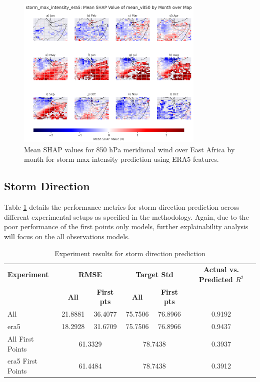 \begin{figure}[ht]
    \centering
    \includegraphics[width=0.8\textwidth]{../figures/generated/experiments/storm_max_intensity/geographic_corr/storm_max_intensity_era5_shap_mean_v850_map_by_month.png}
    \caption{Mean SHAP values for 850 hPa meridional wind over East Africa by month for storm max intensity prediction using ERA5 features.}
    \label{fig:storm_max_intensity_era5_shap_mean_v850_map_by_month}
\end{figure}

\clearpage
\subsection{Storm Direction}

Table \ref{tab:storm_direction_results} details the performance metrics for storm direction prediction across different experimental setups as specified in the methodology. Again, due to the poor performance of the first points only models, further explainability analysis will focus on the all observations models.

\begin{table}[ht]
\centering
\caption{Experiment results for storm direction prediction}
\label{tab:storm_direction_results}
\begin{tabular}{lccccc}
\hline
\textbf{Experiment} & \multicolumn{2}{c}{\textbf{RMSE}} & \multicolumn{2}{c}{\textbf{Target Std}} & \textbf{Actual vs. Predicted $R^2$} \\
\cline{2-5}
 & \textbf{All} & \textbf{First pts} & \textbf{All} & \textbf{First pts} &  \\
\hline
All              & 21.8881 & 36.4077 & 75.7506 & 76.8966 & 0.9192 \\
\acrshort{era5}             & 18.2928 & 31.6709 & 75.7506 & 76.8966 & 0.9437 \\
All First Points & \multicolumn{2}{c}{61.3329} & \multicolumn{2}{c}{78.7438} & 0.3937 \\
\acrshort{era5} First Points & \multicolumn{2}{c}{61.4484} & \multicolumn{2}{c}{78.7438} & 0.3912 \\
\hline
\end{tabular}
\end{table}

